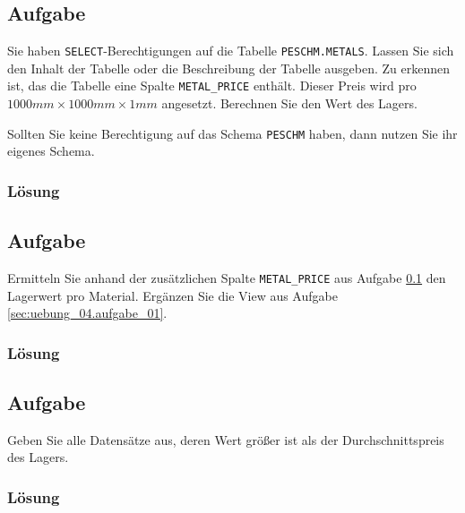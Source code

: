 \subsection{Aufgabe}
\label{sec:uebung_04.aufgabe_04}
Sie haben \texttt{SELECT}-Berechtigungen auf die Tabelle \texttt{PESCHM.METALS}. Lassen Sie sich den Inhalt der Tabelle oder die Beschreibung der Tabelle ausgeben. Zu erkennen ist, das die Tabelle eine Spalte \texttt{METAL\_PRICE} enthält. Dieser Preis wird pro $1000mm\times1000mm\times1mm$ angesetzt. Berechnen Sie den Wert des Lagers.

\begin{info-popup}
  Sollten Sie keine Berechtigung auf das Schema \texttt{PESCHM} haben, dann nutzen Sie ihr eigenes Schema.
\end{info-popup}

\subsubsection*{Lösung}
\label{sec:uebung_04.aufgabe_04.loesung}

\subsection{Aufgabe}
\label{sec:uebung_04.aufgabe_05}
Ermitteln Sie anhand der zusätzlichen Spalte \texttt{METAL\_PRICE} aus Aufgabe \ref{sec:uebung_04.aufgabe_04} den Lagerwert pro Material. Ergänzen Sie die View aus Aufgabe \ref{sec:uebung_04.aufgabe_01}.

\subsubsection*{Lösung}
\label{sec:uebung_04.aufgabe_05.loesung}

\subsection{Aufgabe}
\label{sec:uebung_04.aufgabe_06}
Geben Sie alle Datensätze aus, deren Wert größer ist als der Durchschnittspreis des Lagers.

\subsubsection*{Lösung}
\label{sec:uebung_04.aufgabe_06.loesung}

